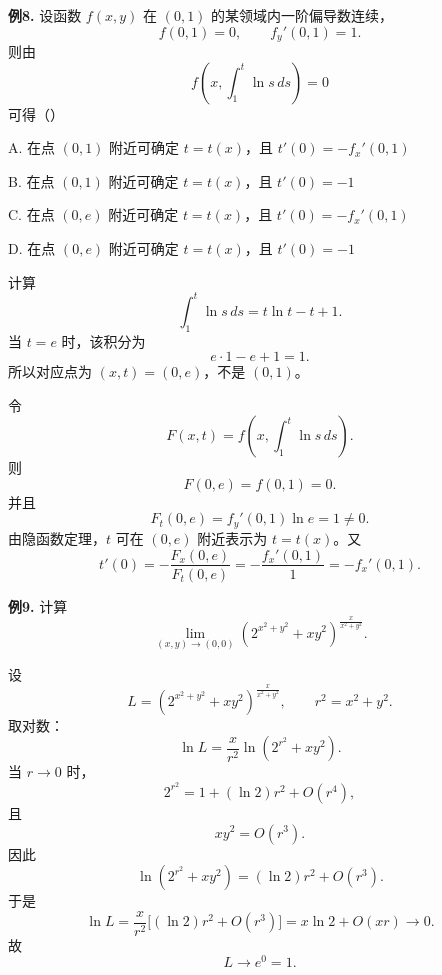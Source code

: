 \begin{problemblock}
\textbf{例8.} 设函数 \(f(x,y)\) 在 \((0,1)\) 的某领域内一阶偏导数连续，
\[
f(0,1)=0,\qquad f_y'(0,1)=1.
\]
则由
\[
f\left(x,\int_1^t\ln s\,ds\right)=0
\]
可得（\quad）

A. 在点 \((0,1)\) 附近可确定 \(t=t(x)\)，且 \(t'(0)=-f_x'(0,1)\)

B. 在点 \((0,1)\) 附近可确定 \(t=t(x)\)，且 \(t'(0)=-1\)

C. 在点 \((0,e)\) 附近可确定 \(t=t(x)\)，且 \(t'(0)=-f_x'(0,1)\)

D. 在点 \((0,e)\) 附近可确定 \(t=t(x)\)，且 \(t'(0)=-1\)
\end{problemblock}
\begin{solutionblock}
计算
\[
\int_1^t\ln s\,ds=t\ln t-t+1.
\]
当 \(t=e\) 时，该积分为
\[
e\cdot1-e+1=1.
\]
所以对应点为 \((x,t)=(0,e)\)，不是 \((0,1)\)。

令
\[
F(x,t)=f\left(x,\int_1^t\ln s\,ds\right).
\]
则
\[
F(0,e)=f(0,1)=0.
\]
并且
\[
F_t(0,e)=f_y'(0,1)\ln e=1\ne0.
\]
由隐函数定理，\(t\) 可在 \((0,e)\) 附近表示为 \(t=t(x)\)。又
\[
t'(0)=-\frac{F_x(0,e)}{F_t(0,e)}
=-\frac{f_x'(0,1)}{1}
=-f_x'(0,1).
\]
\end{solutionblock}

\begin{problemblock}
\textbf{例9.} 计算
\[
\lim_{(x,y)\to(0,0)}
\left(2^{x^2+y^2}+xy^2\right)^{\frac{x}{x^2+y^2}}.
\]
\end{problemblock}
\begin{solutionblock}
设
\[
L=\left(2^{x^2+y^2}+xy^2\right)^{\frac{x}{x^2+y^2}},
\qquad r^2=x^2+y^2.
\]
取对数：
\[
\ln L=\frac{x}{r^2}\ln\left(2^{r^2}+xy^2\right).
\]
当 \(r\to0\) 时，
\[
2^{r^2}=1+(\ln2)r^2+O(r^4),
\]
且
\[
xy^2=O(r^3).
\]
因此
\[
\ln\left(2^{r^2}+xy^2\right)
=(\ln2)r^2+O(r^3).
\]
于是
\[
\ln L
=\frac{x}{r^2}\bigl[(\ln2)r^2+O(r^3)\bigr]
=x\ln2+O(xr)\to0.
\]
故
\[
L\to e^0=1.
\]
\end{solutionblock}

